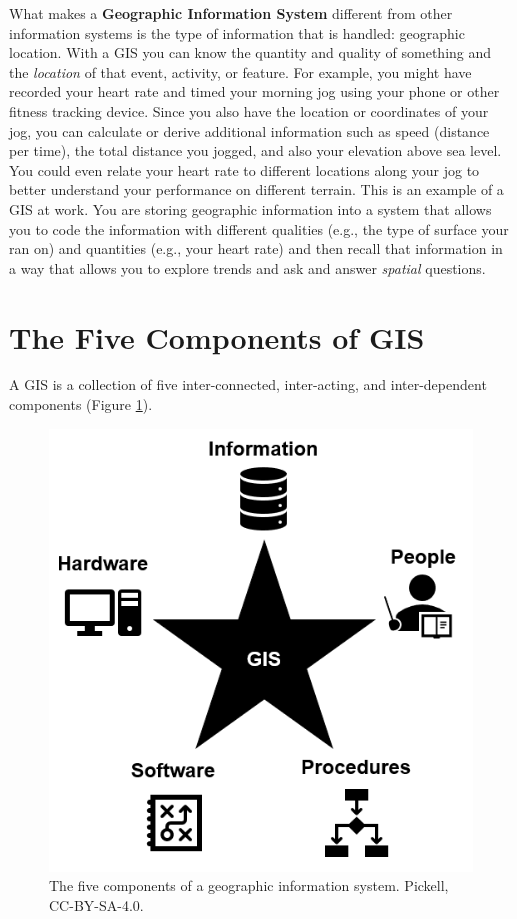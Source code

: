 \documentclass[
]{book}
\begin{document}
What makes a \textbf{Geographic Information System} different from other information systems is the type of information that is handled: geographic location. With a GIS you can know the quantity and quality of something and the \emph{location} of that event, activity, or feature. For example, you might have recorded your heart rate and timed your morning jog using your phone or other fitness tracking device. Since you also have the location or coordinates of your jog, you can calculate or derive additional information such as speed (distance per time), the total distance you jogged, and also your elevation above sea level. You could even relate your heart rate to different locations along your jog to better understand your performance on different terrain. This is an example of a GIS at work. You are storing geographic information into a system that allows you to code the information with different qualities (e.g., the type of surface your ran on) and quantities (e.g., your heart rate) and then recall that information in a way that allows you to explore trends and ask and answer \emph{spatial} questions.

\hypertarget{the-five-components-of-gis}{%
\section{The Five Components of GIS}\label{the-five-components-of-gis}}

A GIS is a collection of five inter-connected, inter-acting, and inter-dependent components (Figure \ref{fig:1-five-components-gis}).

\begin{figure}
\includegraphics[width=0.75\linewidth]{images/01-five-components-gis} \caption{The five components of a geographic information system. Pickell, CC-BY-SA-4.0.}\label{fig:1-five-components-gis}
\end{figure}
\end{document}
